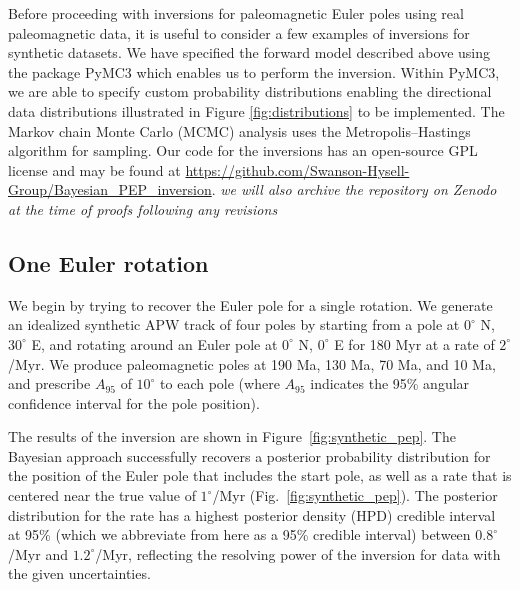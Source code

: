 \documentclass[11pt,letterpaper]{article}
\begin{document}
Before proceeding with inversions for paleomagnetic Euler poles using real paleomagnetic data, it is useful to consider a few examples of inversions for synthetic datasets. We have specified the forward model described above using the package PyMC3 \citep{Salvatier2016a} which enables us to perform the inversion. Within PyMC3, we are able to specify custom probability distributions enabling the directional data distributions illustrated in Figure \ref{fig:distributions} to be implemented. The Markov chain Monte Carlo (MCMC) analysis uses the Metropolis–Hastings algorithm for sampling. Our code for the inversions has an open-source GPL license and may be found at \url{https://github.com/Swanson-Hysell-Group/Bayesian_PEP_inversion}. \textit{we will also archive the repository on Zenodo at the time of proofs following any revisions}



\subsection*{One Euler rotation}
\label{sec:one_stage_pole}
We begin by trying to recover the Euler pole for a single rotation. We generate an idealized synthetic APW track of four poles by starting from a pole at $0^\circ$ N, $30^\circ$ E, and rotating around an Euler pole at $0^\circ$ N, $0^\circ$ E for 180 Myr at a rate of $2^\circ$/Myr.
We produce paleomagnetic poles at 190 Ma, 130 Ma, 70 Ma, and 10 Ma, and prescribe $A_{95}$
of $10^\circ$ to each pole (where $A_{95}$ indicates the 95\% angular confidence interval for the pole position).

The results of the inversion are shown in Figure~\ref{fig:synthetic_pep}. The Bayesian approach successfully recovers a posterior probability distribution for the position of the Euler pole that includes the start pole, as well as a rate that is centered near the true value of $1^\circ$/Myr (Fig.~\ref{fig:synthetic_pep}). The posterior distribution for the rate has a highest posterior density (HPD) credible interval at 95\% 
(which we abbreviate from here as a 95\% credible interval)
between $0.8^\circ$/Myr and $1.2^\circ$/Myr, reflecting the resolving power of the inversion for data with the given uncertainties.
\end{document}
